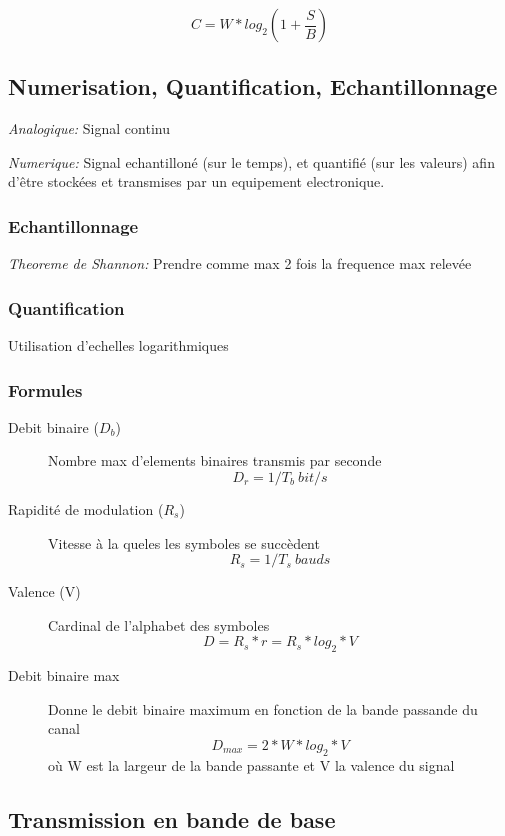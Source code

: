 \documentclass[a4paper, 12pt, french]{article}
\begin{document}
		$$C = W * log_2 \left( 1 + \frac{S}{B} \right)$$

	\subsection{Numerisation, Quantification, Echantillonnage}

	\emph{Analogique:} Signal continu

	\emph{Numerique:} Signal echantilloné (sur le temps), et quantifié (sur les valeurs) afin d'être stockées et transmises par un equipement electronique.

	\subsubsection{Echantillonnage}

	\emph{Theoreme de Shannon:} Prendre comme max 2 fois la frequence max relevée

	\subsubsection{Quantification}

	Utilisation d'echelles logarithmiques

	\subsubsection{Formules}


	\begin{description}
		\item[Debit binaire ($D_b$)] Nombre max d'elements binaires transmis par seconde
			$$D_r = 1/T_b \ bit/s$$
		\item[Rapidité de modulation ($R_s$)] Vitesse à la queles les symboles se succèdent
			$$ R_s = 1/T_s  \ bauds$$
		\item[Valence (V)] Cardinal de l'alphabet des symboles
			$$ D = R_s * r = R_s * log_2 * V $$
		\item[Debit binaire max] Donne le debit binaire maximum en fonction de la bande passande du canal
			$$ D_{max} = 2 * W * log_2 * V $$
			où W est la largeur de la bande passante et V la valence du signal
	\end{description}

	\subsection{Transmission en bande de base}
\end{document}
